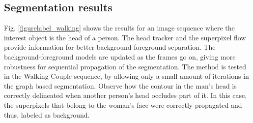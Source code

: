 
\subsection{Segmentation results}

Fig. \ref{figurelabel_walking} shows the results for an image sequence where the interest object is the head of a person.
The head tracker and the superpixel flow provide information for better background-foreground separation. The
background-foreground models are updated as the frames go on, giving more robustness for sequential
propagation of the segmentation. The method is tested in the Walking Couple sequence, by allowing only a small amount of iterations in the
graph based segmentation. Observe how the contour in the man's head is correctly delineated when
another person's head occludes part of it. In this case, the superpixels that belong to the woman’s face
were correctly propagated and thus, labeled as background. \\

